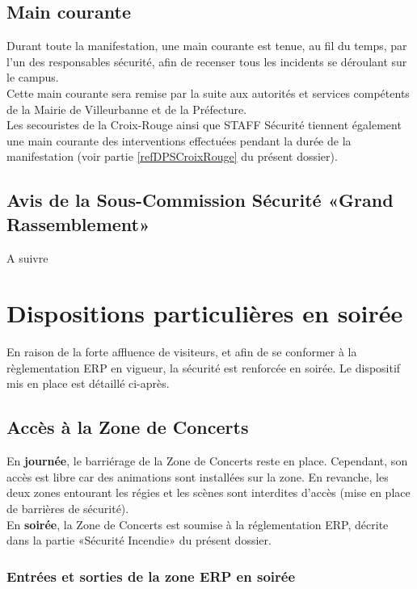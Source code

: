 \documentclass[hidelinks, paper=a4, fontsize=13pt]{report}
\begin{document}
\subsection{Main courante}

Durant toute la manifestation, une main courante est tenue, au fil du temps, par l’un des responsables sécurité, afin de recenser tous les incidents se déroulant sur le campus.\\

Cette main courante sera remise par la suite aux autorités et services compétents de la Mairie de Villeurbanne et de la Préfecture.\\

Les secouristes de la Croix-Rouge ainsi que STAFF Sécurité tiennent également une main courante des interventions effectuées pendant la durée de la manifestation (voir partie \ref{refDPSCroixRouge} du présent dossier).

\subsection{Avis de la Sous-Commission Sécurité «Grand Rassemblement»}

A suivre
\newpage

\section{Dispositions particulières en soirée}

En raison de la forte affluence de visiteurs, et afin de se conformer à la règlementation ERP en vigueur, la sécurité est renforcée en soirée. Le dispositif mis en place est détaillé ci-après.

\subsection{Accès à la Zone de Concerts}
\label{sec:acces_zc_soiree}

En \textbf{journée}, le barriérage de la Zone de Concerts reste en place. Cependant, son accès est libre car des animations sont installées sur la zone. En revanche, les deux zones entourant les régies et les scènes sont interdites d’accès (mise en place de barrières de sécurité).\\

En \textbf{soirée}, la Zone de Concerts est soumise à la réglementation ERP, décrite dans la partie «Sécurité Incendie» du présent dossier. 

\subsubsection{Entrées et sorties de la zone ERP en soirée}
\end{document}

